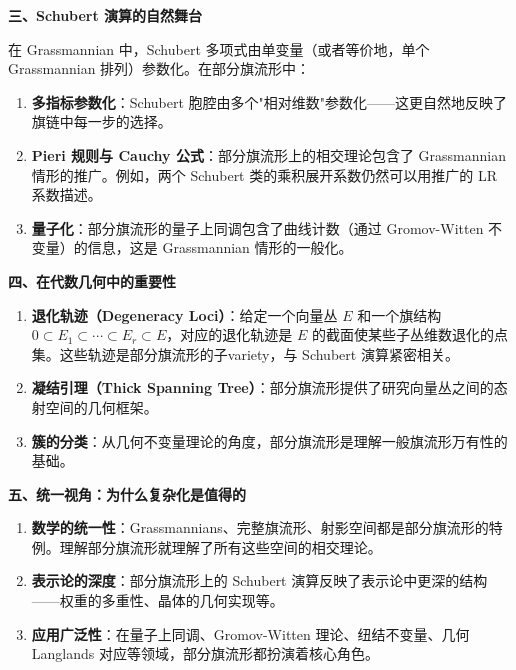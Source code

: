 \textbf{三、Schubert 演算的自然舞台}

在 Grassmannian 中，Schubert 多项式由单变量（或者等价地，单个 Grassmannian 排列）参数化。在部分旗流形中：

\begin{enumerate}
\item \textbf{多指标参数化}：Schubert 胞腔由多个"相对维数"参数化——这更自然地反映了旗链中每一步的选择。

\item \textbf{Pieri 规则与 Cauchy 公式}：部分旗流形上的相交理论包含了 Grassmannian 情形的推广。例如，两个 Schubert 类的乘积展开系数仍然可以用推广的 LR 系数描述。

\item \textbf{量子化}：部分旗流形的量子上同调包含了曲线计数（通过 Gromov-Witten 不变量）的信息，这是 Grassmannian 情形的一般化。
\end{enumerate}

\textbf{四、在代数几何中的重要性}

\begin{enumerate}
\item \textbf{退化轨迹（Degeneracy Loci）}：给定一个向量丛 $E$ 和一个旗结构 $0 \subset E_1 \subset \cdots \subset E_r \subset E$，对应的退化轨迹是 $E$ 的截面使某些子丛维数退化的点集。这些轨迹是部分旗流形的子variety，与 Schubert 演算紧密相关。

\item \textbf{凝结引理（Thick Spanning Tree）}：部分旗流形提供了研究向量丛之间的态射空间的几何框架。

\item \textbf{簇的分类}：从几何不变量理论的角度，部分旗流形是理解一般旗流形万有性的基础。
\end{enumerate}

\textbf{五、统一视角：为什么复杂化是值得的}

\begin{enumerate}
\item \textbf{数学的统一性}：Grassmannians、完整旗流形、射影空间都是部分旗流形的特例。理解部分旗流形就理解了所有这些空间的相交理论。

\item \textbf{表示论的深度}：部分旗流形上的 Schubert 演算反映了表示论中更深的结构——权重的多重性、晶体的几何实现等。

\item \textbf{应用广泛性}：在量子上同调、Gromov-Witten 理论、纽结不变量、几何 Langlands 对应等领域，部分旗流形都扮演着核心角色。
\end{enumerate}

